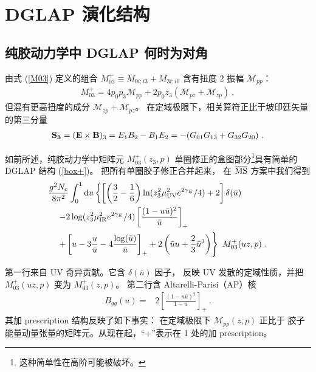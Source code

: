 \section{DGLAP 演化结构}

\subsection{纯胶动力学中 DGLAP 何时为对角}

由式 (\ref{M03}) 定义的组合 $M_{03} ^+\equiv
{ M}_{0 i; i 3} + { M}_{3 i;i 0}$ 含有扭度 2 振幅 $\mathcal{M}_{pp}$：
\begin{align}
M_{03} ^+
= 4 p_0 p_3 \mathcal{M}_{pp} +
2 p_0 z_3 \left ( \mathcal{M}_{pz} +\mathcal{M}_{zp} \right) \ ,
\end{align}
但混有更高扭度的成分 \mbox{$\mathcal{M}_{zp}+ \mathcal{M}_{pz}$}。
在定域极限下，相关算符正比于坡印廷矢量的第三分量
\begin{align*}
{\bf S_3}=
({\bf E \times B})_3 =E_1 B_2- B_1 E_2 =-( G_{01} G_{13} +G_{32} G_{20}) \ .
\end{align*}

如前所述，纯胶动力学中矩阵元
$M_{03} ^+(z_3,p)$ 单圈修正的盒图部分\footnote{这种简单性在高阶可能被破坏。}具有简单的 DGLAP 结构 (\ref{box+})。
把所有单圈胶子修正合并起来，
在 $\overline{\rm MS}$ 方案中我们得到
\begin{align}
& \frac{g^2N_c}{8\pi^2}\int_0^1 \mathrm{d} u
\left\{ \left[ \left (\frac{3}{2} -\frac16 \right ) \ln(z_3^2 \mu_{\rm UV}^2 e^{2\gamma_E}/4) +2 \right] \delta(\bar u) \right. \nonumber \\
&\quad \left. - 2 \log(z_3^2 \mu_{\rm IR}^2 e^{2\gamma_E}/4) \left [ \frac{(1- u \bar u)^2}{\bar u} \right ]_+ \right.
\label{M031L} \\
&\quad \left. + \left [ u -3 \frac{u}{\bar u} -4 \frac{\log (\bar u)}{\bar u} \right ]_+
+ 2 \left (\bar uu + \frac{2}{3}\bar u^3 \right ) \right\} \ M_{03} ^+(uz,p) \ .\nonumber
\end{align}

第一行来自 UV 奇异贡献。它含 $\delta(\bar u)$ 因子，
反映 UV 发散的定域性质，并把
$M_{03} ^+(uz,p)$ 变为 $M_{03} ^+(z,p)$。
第二行含 Altarelli-Parisi（AP）核
\begin{align}
B_{gg} (u) =&
2 \left [\frac{(1-u\bar u)^2} {1-u} \right ]_{+} \ .
\label{V1}
\end{align}
其加 prescription 结构反映了如下事实：
在定域极限下 ${\mathcal{M}}_{pp}(z,p)$ 正比于
胶子能量动量张量的矩阵元。从现在起，``+''表示在 1 处的加 prescription。

